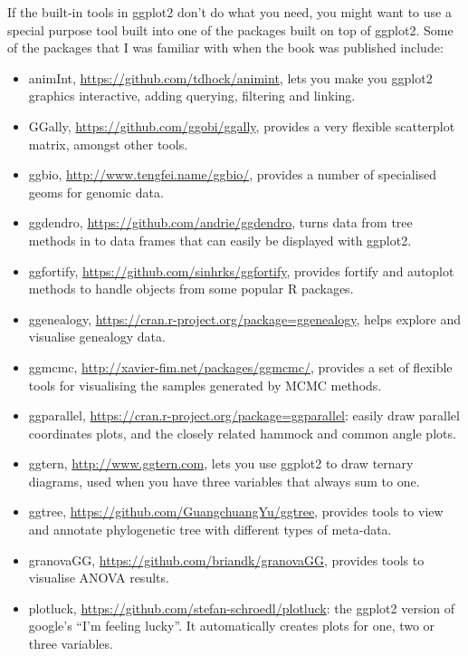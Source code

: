 
If the built-in tools in ggplot2 don't do what you need, you might want
to use a special purpose tool built into one of the packages built on
top of ggplot2. Some of the packages that I was familiar with when the
book was published include:

\begin{itemize}
\item
  animInt, \url{https://github.com/tdhock/animint}, lets you make you
  ggplot2 graphics interactive, adding querying, filtering and linking.
\item
  GGally, \url{https://github.com/ggobi/ggally}, provides a very
  flexible scatterplot matrix, amongst other tools.
\item
  ggbio, \url{http://www.tengfei.name/ggbio/}, provides a number of
  specialised geoms for genomic data.
\item
  ggdendro, \url{https://github.com/andrie/ggdendro}, turns data from
  tree methods in to data frames that can easily be displayed with
  ggplot2.
\item
  ggfortify, \url{https://github.com/sinhrks/ggfortify}, provides
  fortify and autoplot methods to handle objects from some popular R
  packages.
\item
  ggenealogy, \url{https://cran.r-project.org/package=ggenealogy}, helps
  explore and visualise genealogy data.
\item
  ggmcmc, \url{http://xavier-fim.net/packages/ggmcmc/}, provides a set
  of flexible tools for visualising the samples generated by MCMC
  methods.
\item
  ggparallel, \url{https://cran.r-project.org/package=ggparallel}:
  easily draw parallel coordinates plots, and the closely related
  hammock and common angle plots.
\item
  ggtern, \url{http://www.ggtern.com}, lets you use ggplot2 to draw
  ternary diagrams, used when you have three variables that always sum
  to one.
\item
  ggtree, \url{https://github.com/GuangchuangYu/ggtree}, provides tools
  to view and annotate phylogenetic tree with different types of
  meta-data.
\item
  granovaGG, \url{https://github.com/briandk/granovaGG}, provides tools
  to visualise ANOVA results.
\item
  plotluck, \url{https://github.com/stefan-schroedl/plotluck}: the
  ggplot2 version of google's ``I'm feeling lucky''. It automatically
  creates plots for one, two or three variables.
\end{itemize}

